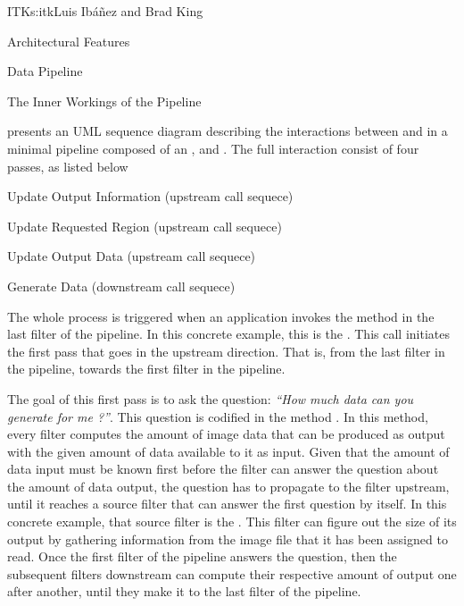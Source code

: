 \begin{aosachapter}{ITK}{s:itk}{Luis Ib\'{a}\~{n}ez and Brad King}
\begin{aosasect1}{Architectural Features}
\begin{aosasect2}{Data Pipeline}
\begin{aosasect3}{The Inner Workings of the Pipeline}


 presents an UML
sequence diagram describing the interactions between  and
 in a minimal pipeline composed of an ,
 and . The full interaction
consist of four passes, as listed below

\begin{aosaitemize}
\item Update Output Information (upstream call sequece)
\item Update Requested Region (upstream call sequece)
\item Update Output Data (upstream call sequece)
\item Generate Data (downstream call sequece)
\end{aosaitemize}

The whole process is triggered when an application invokes the 
method in the last filter of the pipeline. In this concrete example, this is
the . This  call initiates the first pass
that goes in the upstream direction. That is, from the last filter in the
pipeline, towards the first filter in the pipeline.

The goal of this first pass is to ask the question: \emph{``How much data can
you generate for me ?''}. This question is codified in the method
. In this method, every filter computes the
amount of image data that can be produced as output with the given amount of
data available to it as input. Given that the amount of data input must be
known first before the filter can answer the question about the amount of data
output, the question has to propagate to the filter upstream, until it reaches
a source filter that can answer the first question by itself. In this concrete
example, that source filter is the . This filter can
figure out the size of its output by gathering information from the image file
that it has been assigned to read. Once the first filter of the pipeline
answers the question, then the subsequent filters downstream can compute their
respective amount of output one after another, until they make it to the last
filter of the pipeline.


\end{aosasect3}
\end{aosasect2}
\end{aosasect1}
\end{aosachapter}
